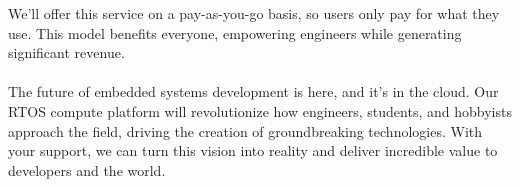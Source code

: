 \documentclass{article}
\begin{document}
We'll offer this service on a pay-as-you-go basis, so users only pay for what
they use. This model benefits everyone, empowering engineers while generating
significant revenue. \\ \hfill \\

The future of embedded systems development is here, and it's in the cloud.
Our RTOS compute platform will revolutionize how engineers, students, and
hobbyists approach the field, driving the creation of groundbreaking
technologies. With your support, we can turn this vision into reality and
deliver incredible value to developers and the world.
\end{document}
